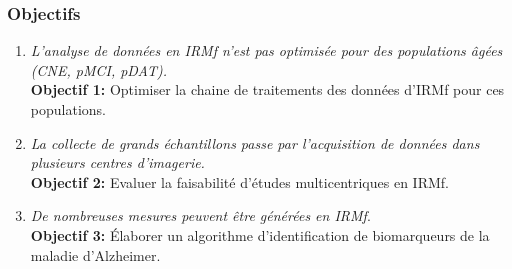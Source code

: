 \documentclass{beamer}
\begin{document}

% 
% 


\begin{frame}
\frametitle{Objectifs}
\begin{enumerate}
\item \emph{L'analyse de données en IRMf n'est pas optimisée pour des populations âgées (CNE, pMCI, pDAT).}\\ \textbf{Objectif 1:} Optimiser la chaine de traitements des données d'IRMf pour ces populations. 
\item \emph{La collecte de grands échantillons passe par l'acquisition de données dans plusieurs centres d'imagerie.}\\ \textbf{Objectif 2:} Evaluer la faisabilité d'études multicentriques en IRMf.
\item \emph{De nombreuses mesures peuvent être générées en IRMf}.\\ \textbf{Objectif 3:} Élaborer un algorithme d'identification de biomarqueurs de la maladie d'Alzheimer.
\end{enumerate}
\end{frame}
\end{document}
